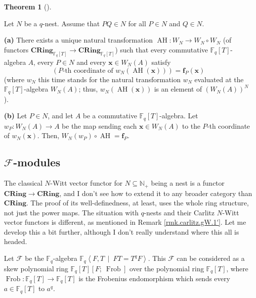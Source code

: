 \documentclass[numbers=enddot,12pt,final,onecolumn,notitlepage]{scrartcl}%
\theoremstyle{definition}
\newtheorem{theo}{Theorem}[section]
\newenvironment{theorem}[1][]
{\begin{theo}[#1]\begin{leftbar}}
{\end{leftbar}\end{theo}}
\begin{document}
\begin{theorem}
\label{thm.carlitz.Witt.AH}Let $N$ be a $q$-nest. Assume that $PQ\in N$ for
all $P\in N$ and $Q\in N$.

\textbf{(a)} There exists a unique natural transformation $\operatorname*{AH}%
:W_{N}\rightarrow W_{N}\circ W_{N}$ (of functors $\mathbf{CRing}%
_{\mathbb{F}_{q}\left[  T\right]  }\rightarrow\mathbf{CRing}_{\mathbb{F}%
_{q}\left[  T\right]  }$) such that every commutative $\mathbb{F}_{q}\left[
T\right]  $-algebra $A$, every $P\in N$ and every $\mathbf{x}\in W_{N}\left(
A\right)  $ satisfy%
\[
\left(  P\text{-th coordinate of }w_{N}\left(  \operatorname*{AH}\left(
\mathbf{x}\right)  \right)  \right)  =\mathbf{f}_{P}\left(  \mathbf{x}\right)
\]
(where $w_{N}$ this time stands for the natural transformation $w_{N}$
evaluated at the $\mathbb{F}_{q}\left[  T\right]  $-algebra $W_{N}\left(
A\right)  $; thus, $w_{N}\left(  \operatorname*{AH}\left(  \mathbf{x}\right)
\right)  $ is an element of $\left(  W_{N}\left(  A\right)  \right)  ^{N}$).

\textbf{(b)} Let $P\in N$, and let $A$ be a commutative $\mathbb{F}_{q}\left[
T\right]  $-algebra. Let $w_{P}:W_{N}\left(  A\right)  \rightarrow A$ be the
map sending each $\mathbf{x}\in W_{N}\left(  A\right)  $ to the $P$-th
coordinate of $w_{N}\left(  \mathbf{x}\right)  $. Then, $W_{N}\left(
w_{P}\right)  \circ\operatorname*{AH}=\mathbf{f}_{P}$.
\end{theorem}

\subsection{\label{subsect.F}$\mathcal{F}$-modules}

The classical $N$-Witt vector functor for $N\subseteq\mathbb{N}_{+}$ being a
nest is a functor $\mathbf{CRing}\rightarrow\mathbf{CRing}$, and I don't see
how to extend it to any broader category than $\mathbf{CRing}$. The proof of
its well-definedness, at least, uses the whole ring structure, not just the
power maps. The situation with $q$-nests and their Carlitz $N$-Witt vector
functors is different, as mentioned in Remark \ref{rmk.carlitz.gW.1'}. Let me
develop this a bit further, although I don't really understand where this all
is headed.

Let $\mathcal{F}$ be the $\mathbb{F}_{q}$-algebra $\mathbb{F}_{q}\left\langle
F,T\ \mid\ FT=T^{q}F\right\rangle $. This $\mathcal{F}$ can be considered as a
skew polynomial ring $\mathbb{F}_{q}\left[  T\right]  \left[
F;\ \operatorname*{Frob}\right]  $ over the polynomial ring $\mathbb{F}%
_{q}\left[  T\right]  $, where $\operatorname*{Frob}:\mathbb{F}_{q}\left[
T\right]  \rightarrow\mathbb{F}_{q}\left[  T\right]  $ is the Frobenius
endomorphism which sends every $a\in\mathbb{F}_{q}\left[  T\right]  $ to
$a^{q}$.
\end{document}

